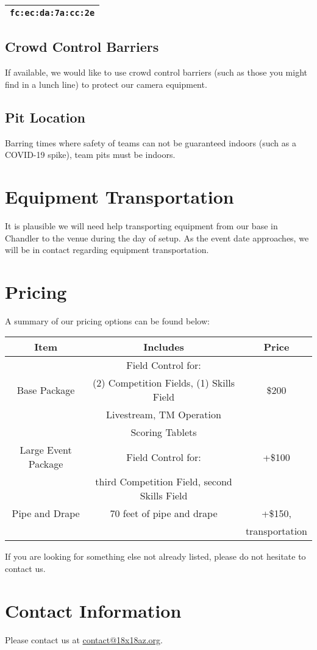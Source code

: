 \documentclass[12pt]{article}
\begin{document}
\begin{centering}

    \begin{tabular}{|c|}
\hline
\texttt{fc:ec:da:7a:cc:2e} \\
\hline
\end{tabular}

\end{centering}

\subsection{Crowd Control Barriers}
If available, we would like to use crowd control barriers (such as those you might find in a lunch line) to protect our camera equipment.

\subsection{Pit Location}
Barring times where safety of teams can not be guaranteed indoors (such as a COVID-19 spike), team pits must be indoors.

\section{Equipment Transportation}
It is plausible we will need help transporting equipment from our base in Chandler to the venue during the day of setup.
As the event date approaches, we will be in contact regarding equipment transportation.

\section{Pricing}
A summary of our pricing options can be found below:
\begin{center}
    \begin{tabular}{|c|c|c|}
        \hline
        \textbf{Item} & \textbf{Includes} & \textbf{Price} \\
        \hline
                 & Field Control for:    &  \\
        Base Package & (2) Competition Fields, (1) Skills Field         & \$200 \\
                 & Livestream, TM Operation & \\
                 & Scoring Tablets          & \\
        \hline
        Large Event Package & Field Control for: & +\$100 \\
        & third Competition Field, second Skills Field & \\
        \hline
        Pipe and Drape & 70 feet of pipe and drape & +\$150, \\
                       & & transportation \\
        \hline
    \end{tabular}
\end{center}
If you are looking for something else not already listed, please do not hesitate to contact us.

\section{Contact Information}
Please contact us at \href{mailto:contact@18x18az.org}{contact@18x18az.org}.
\end{document}
